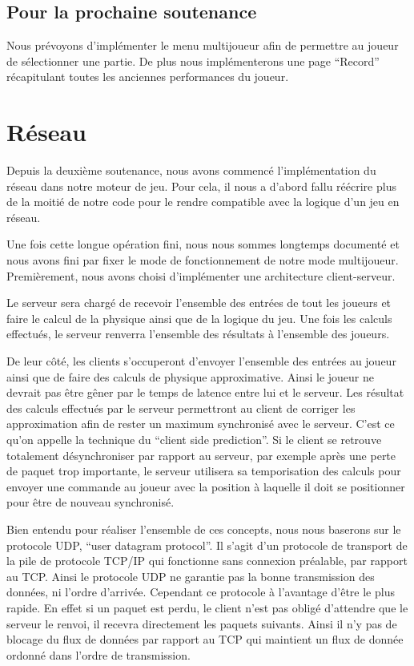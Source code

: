 \documentclass[11pt]{report}
\begin{document}
\subsection{Pour la prochaine soutenance}

Nous prévoyons d'implémenter le menu multijoueur afin de permettre au joueur de sélectionner une partie. De plus nous implémenterons une page ``Record'' récapitulant toutes les anciennes performances du joueur.


\newpage
\section{Réseau}

Depuis la deuxième soutenance, nous avons commencé l'implémentation du réseau dans notre moteur de jeu. Pour cela, il nous a d'abord fallu réécrire plus de la moitié de notre code pour le rendre compatible avec la logique d'un jeu en réseau.

Une fois cette longue opération fini, nous nous sommes longtemps documenté et nous avons fini par fixer le mode de fonctionnement de notre mode multijoueur. Premièrement, nous avons choisi d'implémenter une architecture client-serveur. 

Le serveur sera chargé de recevoir l'ensemble des entrées de tout les joueurs et faire le calcul de la physique ainsi que de la logique du jeu. Une fois les calculs effectués, le serveur renverra l'ensemble des résultats à l'ensemble des joueurs.

De leur côté, les clients s'occuperont d'envoyer l'ensemble des entrées au joueur ainsi que de faire des calculs de physique approximative. Ainsi le joueur ne devrait pas être gêner par le temps de latence entre lui et le serveur. Les résultat des calculs effectués par le serveur permettront au client de corriger les approximation afin de rester un maximum synchronisé avec le serveur. C'est ce qu'on appelle la technique du ``client side prediction''. Si le client se retrouve totalement désynchroniser par rapport au serveur, par exemple après une perte de paquet trop importante, le serveur utilisera sa temporisation des calculs pour envoyer une commande au joueur avec la position à laquelle il doit se positionner pour être de nouveau synchronisé.

Bien entendu pour réaliser l'ensemble de ces concepts, nous nous baserons sur le protocole UDP, ``user datagram protocol''. Il s'agit d'un protocole de transport de la pile de protocole TCP/IP qui fonctionne sans connexion préalable, par rapport au TCP. Ainsi le protocole UDP ne garantie pas la bonne transmission des données, ni l'ordre d'arrivée. Cependant ce protocole à l'avantage d'être le plus rapide. En effet si un paquet est perdu, le client n'est pas obligé d'attendre que le serveur le renvoi, il recevra directement les paquets suivants. Ainsi il n'y pas de blocage du flux de données par rapport au TCP qui maintient un flux de donnée ordonné dans l'ordre de transmission.
\end{document}
